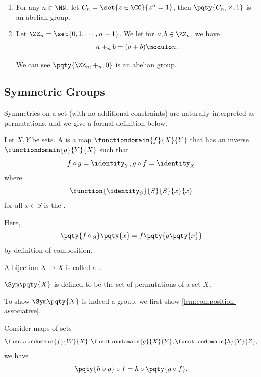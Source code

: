 \begin{examples*}
    \begin{enumerate}
        \item For any \(n \in \NN\), let \(C_n = \set{z \in \CC}{z^n = 1}\), then \(\pqty{C_n, \times, 1}\) is an abelian group.
        \item Let \(\ZZ_n = \set{0, 1, \cdots, n - 1}\). We let for \(a, b \in \ZZ_n\), we have
        \[
            a +_n b = (a + b) \modulo n.
        \]

        We can see \(\pqty{\ZZ_n, +_n, 0}\) is an abelian group.
    \end{enumerate}
\end{examples*}

\subsection{Symmetric Groups}
\label{sec:symmetric-groups}

Symmetries on a set (with no additional constraints) are naturally interpreted as permutations, and we give a formal definition below.

\begin{definition}
    \label{def:bijection-permutation}%
    Let \(X, Y\) be sets. A  is a map \(\functiondomain{f}{X}{Y}\) that has an inverse \(\functiondomain{g}{Y}{X}\) such that
    \[
        f \circ g = \identity_Y, g \circ f = \identity_X
    \]
    where
    \[
        \function{\identity_S}{S}{S}{x}{x}
    \]
    for all \(x \in S\) is the .

    Here,
    \[
        \pqty{f \circ g}\pqty{x} = f \pqty{g \pqty{x}}
    \]
    by definition of composition.

    A bijection \(X \to X\) is called a .
\end{definition}

\begin{definition}
    \label{def:symmetry-group}%
    \(\Sym\pqty{X}\) is defined to be the set of permutations of a set \(X\).
\end{definition}

To show \(\Sym\pqty{X}\) is indeed a group, we first show \autoref{lem:composition-associative}.

\begin{lemma}
    \label{lem:composition-associative}%
    Consider maps of sets
    \[
        \functiondomain{f}{W}{X}, \functiondomain{g}{X}{Y}, \functiondomain{h}{Y}{Z},
    \]
    we have
    \[
        \pqty{h \circ g} \circ f = h \circ \pqty{g \circ f}.
    \]
\end{lemma}


